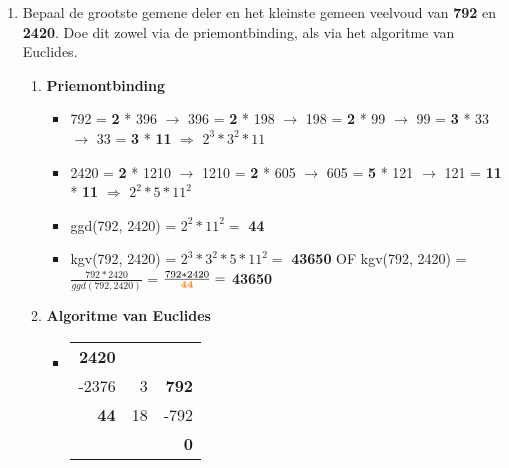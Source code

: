 \documentclass[12pt]{report}
\newcommand{\important}[1] {\textbf{\color{orange}#1}}
\begin{document}
\begin{enumerate}
	\item Bepaal de grootste gemene deler en het kleinste gemeen veelvoud van \important{792} en \important{2420}. Doe dit zowel via de 
	      priemontbinding, als via het algoritme van Euclides.
	      \begin{enumerate}
	      	\item \important{Priemontbinding} 
	      	      \begin{itemize}[label={}]
	      	      	\item 792 = \important{2} * 396 $\rightarrow$ 396 = \important{2} * 198 $\rightarrow$
	      	      	      198 = \important{2} * 99 $\rightarrow$ 99 = \important{3} * 33 $\rightarrow$ 33 = \important{3} * \important{11} 
	      	      	      $\Rightarrow$ $2^3 * 3^2 * 11$
	      	      	      	      	      	          
	      	      	\item 2420 = \important{2} * 1210 $\rightarrow$ 1210 = \important{2} * 605 $\rightarrow$ 605 = \important{5} * 121 $\rightarrow$ 
	      	      	      121 = \important{11} * \important{11} 
	      	      	      $\Rightarrow$ $2^2 * 5 * 11^2$
	      	      	      	      	      	          
	      	      	\item ggd(792, 2420) = $2^2 * 11^2 = $ \important{44}
	      	      	\item kgv(792, 2420) = $2^3 * 3^2 * 5 * 11^2 = $ \important{43650} \newline 
	      	      	      OF 
	      	      	      \newline kgv(792, 2420) = $\frac{792 * 2420}{ggd(792, 2420)}$ =
	      	      	      $\frac{792 * 2420}{\important{44}} = $ \important{43650}
	      	      \end{itemize}
	      	\item \important{Algoritme van Euclides}
	      	      \begin{itemize}[label={}]
	      	      	\item   \begin{tabular}{r|r|r}
	      	      	      \important{2420} & & \\
	      	      	      -2376 & 3 & \important{792} \\
	      	      	      \important{44} & 18 & -792 \\
	      	      	      & & \important{0}
	      	      	\end{tabular}
	      	      		      	      	

\end{itemize}
\end{enumerate}
\end{enumerate}
\end{document}
